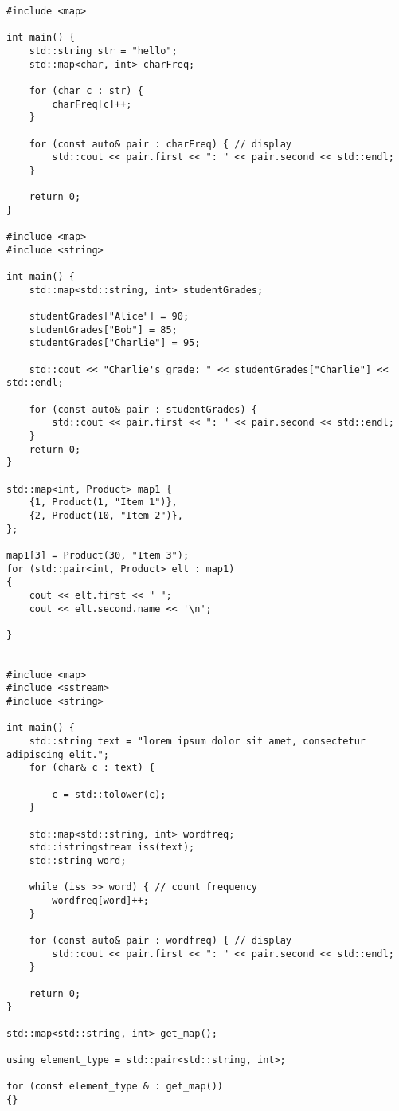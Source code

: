 \documentclass[openany]{report}
\begin{document}
\begin{verbatim}
#include <map>

int main() {
    std::string str = "hello";
    std::map<char, int> charFreq;

    for (char c : str) {
        charFreq[c]++;
    }

    for (const auto& pair : charFreq) { // display
        std::cout << pair.first << ": " << pair.second << std::endl;
    }

    return 0;
}

#include <map>
#include <string>

int main() {
    std::map<std::string, int> studentGrades;

    studentGrades["Alice"] = 90;
    studentGrades["Bob"] = 85;
    studentGrades["Charlie"] = 95;

    std::cout << "Charlie's grade: " << studentGrades["Charlie"] << std::endl;

    for (const auto& pair : studentGrades) {
        std::cout << pair.first << ": " << pair.second << std::endl;
    }
    return 0;
}

std::map<int, Product> map1 {
    {1, Product(1, "Item 1")},
    {2, Product(10, "Item 2")},
};

map1[3] = Product(30, "Item 3");
for (std::pair<int, Product> elt : map1)
{
    cout << elt.first << " ";
    cout << elt.second.name << '\n';

}


#include <map>
#include <sstream>
#include <string>

int main() {
    std::string text = "lorem ipsum dolor sit amet, consectetur adipiscing elit.";
    for (char& c : text) {

        c = std::tolower(c);
    }

    std::map<std::string, int> wordfreq;
    std::istringstream iss(text);
    std::string word;

    while (iss >> word) { // count frequency
        wordfreq[word]++;
    }

    for (const auto& pair : wordfreq) { // display
        std::cout << pair.first << ": " << pair.second << std::endl;
    }

    return 0;
}

std::map<std::string, int> get_map();

using element_type = std::pair<std::string, int>;

for (const element_type & : get_map())
{}
\end{verbatim}
\end{document}
